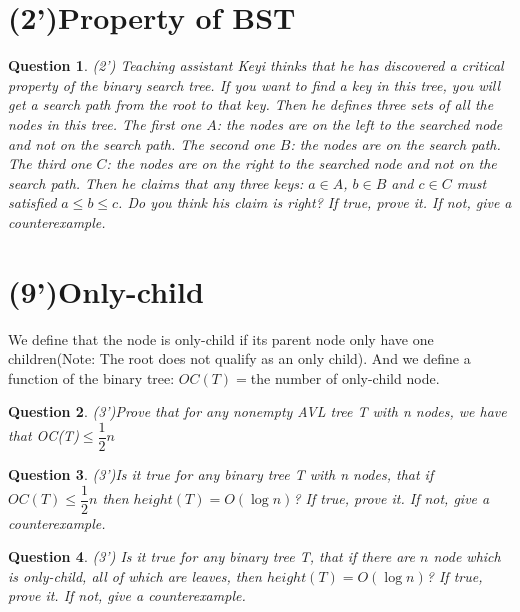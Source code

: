 \documentclass{article}
\newtheorem{Q}{Question}
\begin{document}
\pagebreak
\section{(2')Property of BST}
\begin{Q}(2')
Teaching assistant Keyi thinks that he has discovered a critical property of the binary search tree. If you want to find a key in this tree, you will get a search path from the root to that key. Then he defines three sets of all the nodes in this tree. The first one $A$: the nodes are on the left to the searched node and not on the search path. The second one $B$: the nodes are on the search path. The third one $C$: the nodes are on the right to the searched node and not on the search path. Then he claims that any three keys: $a\in A$, $b\in B$ and $c\in C$ must satisfied $a\leq b\leq c$. Do you think his claim is right? If true, prove it. If not, give a counterexample. 
\end{Q}
\newpage

\section{(9')Only-child}
We define that the node is only-child if its parent node only have one children(Note: The root does not qualify as an only child). And we define a function of the binary tree: $OC(T)=$the number of only-child node.


\begin{Q}
(3')Prove that for any nonempty AVL tree T with n nodes, we have that OC(T)$\leq\dfrac{1}{2}n$
\end{Q}

\vspace{6cm}
\begin{Q}
(3')Is it true for any binary tree T with n nodes, that if $OC(T)\leq\dfrac{1}{2}n$ then $height(T)=O(\log n)$? If true, prove it. If not, give a counterexample.
\end{Q}
\vspace{6cm}
\begin{Q}
(3') Is it true for any binary tree T, that if there are $n$ node which is only-child, all of which are leaves, then $height(T)=O(\log n)$?
If true, prove it. If not, give a counterexample.
\end{Q}
\end{document}
